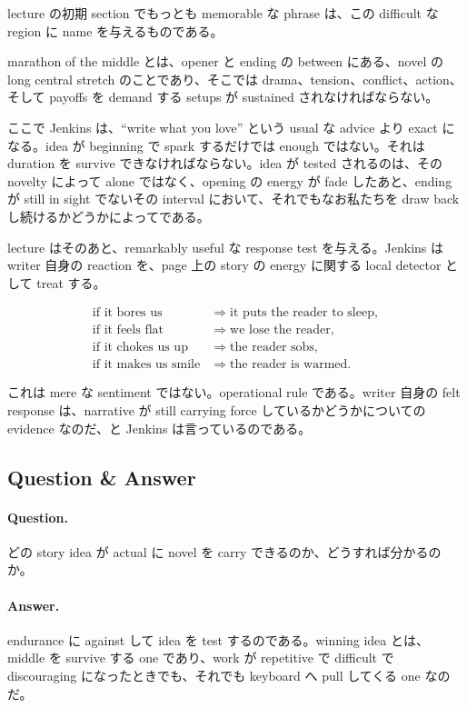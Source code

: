 lecture の初期 section でもっとも memorable な phrase は、この difficult な region に name を与えるものである。

\begin{definition}
marathon of the middle とは、opener と ending の between にある、novel の long central stretch のことであり、そこでは drama、tension、conflict、action、そして payoffs を demand する setups が sustained されなければならない。
\end{definition}

ここで Jenkins は、``write what you love'' という usual な advice より exact になる。idea が beginning で spark するだけでは enough ではない。それは duration を survive できなければならない。idea が tested されるのは、その novelty によって alone ではなく、opening の energy が fade したあと、ending が still in sight でないその interval において、それでもなお私たちを draw back し続けるかどうかによってである。

lecture はそのあと、remarkably useful な response test を与える。Jenkins は writer 自身の reaction を、page 上の story の energy に関する local detector として treat する。

\begin{align}
\text{if it bores us} &\Rightarrow \text{it puts the reader to sleep},\\
\text{if it feels flat} &\Rightarrow \text{we lose the reader},\\
\text{if it chokes us up} &\Rightarrow \text{the reader sobs},\\
\text{if it makes us smile} &\Rightarrow \text{the reader is warmed}.
\end{align}

これは mere な sentiment ではない。operational rule である。writer 自身の felt response は、narrative が still carrying force しているかどうかについての evidence なのだ、と Jenkins は言っているのである。

\subsection{Question \& Answer}

\paragraph{Question.} どの story idea が actual に novel を carry できるのか、どうすれば分かるのか。

\paragraph{Answer.} endurance に against して idea を test するのである。winning idea とは、middle を survive する one であり、work が repetitive で difficult で discouraging になったときでも、それでも keyboard へ pull してくる one なのだ。

